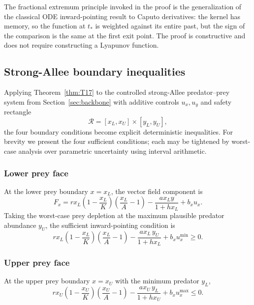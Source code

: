 The fractional extremum principle invoked in the proof is the generalization of the classical ODE inward-pointing result to Caputo derivatives: the kernel has memory, so the function at \(t_*\) is weighted against its entire past, but the sign of the comparison is the same at the first exit point. The proof is constructive and does not require constructing a Lyapunov function.

\subsection{Strong-Allee boundary inequalities}

Applying Theorem~\ref{thm:T17} to the controlled strong-Allee predator--prey system from Section~\ref{sec:backbone} with additive controls \(u_x, u_y\) and safety rectangle
\begin{equation}
\mathcal{R} = [x_L, x_U] \times [y_L, y_U],
\label{eq:safe_box}
\end{equation}
the four boundary conditions become explicit deterministic inequalities. For brevity we present the four sufficient conditions; each may be tightened by worst-case analysis over parametric uncertainty using interval arithmetic.

\subsubsection*{Lower prey face}

At the lower prey boundary \(x = x_L\), the vector field component is
\[
F_x = r x_L \left(1 - \frac{x_L}{K}\right) \left(\frac{x_L}{A} - 1\right)
- \frac{a x_L y}{1 + h x_L} + b_x u_x.
\]
Taking the worst-case prey depletion at the maximum plausible predator abundance \(y_U\), the sufficient inward-pointing condition is
\begin{equation}
\boxed{
r x_L \left(1 - \frac{x_L}{K}\right) \left(\frac{x_L}{A} - 1\right)
- \frac{a x_L\, y_U}{1 + h x_L} + b_x u_x^{\min} \ge 0 }.
\label{eq:lower_prey}
\end{equation}

\subsubsection*{Upper prey face}

At the upper prey boundary \(x = x_U\) with the minimum predator \(y_L\),
\begin{equation}
\boxed{
r x_U \left(1 - \frac{x_U}{K}\right) \left(\frac{x_U}{A} - 1\right)
- \frac{a x_U\, y_L}{1 + h x_U} + b_x u_x^{\max} \le 0 }.
\label{eq:upper_prey}
\end{equation}

